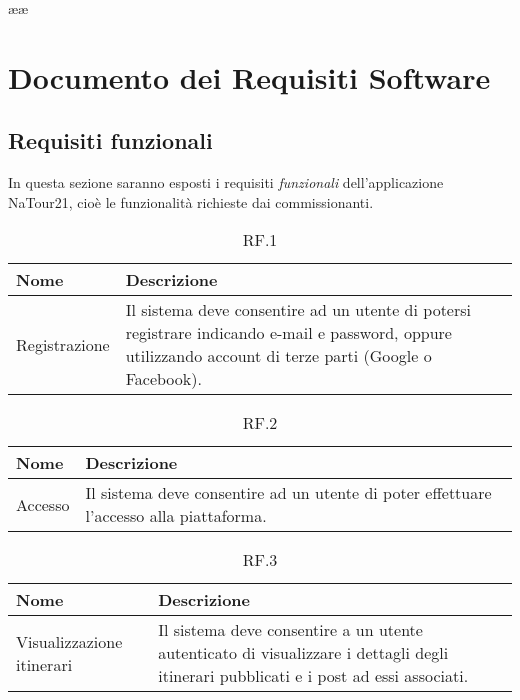ææ\documentclass{natourDoc}
\begin{document}
	\section{Documento dei Requisiti Software}
	\subsection{Requisiti funzionali}
	In questa sezione saranno esposti i requisiti \textit{funzionali} dell'applicazione NaTour21, cioè le funzionalità richieste dai commissionanti.
	
	\begin{table}[H]
		\centering
		\begin{tabular}{ |p{5cm}|p{10.3cm}| } 
			\hline
			\rowcolor{PineGreen!70}
			\textbf{Nome} & \textbf{Descrizione} \\
			\hline
			Registrazione & Il sistema deve consentire ad un utente di potersi registrare indicando e-mail e password, oppure utilizzando account di terze parti (Google o Facebook).\\ 
			\hline
		\end{tabular}
		\caption{RF.1}
		\label{table:1}
	\end{table}
	
	\begin{table}[H]
		\centering
		\begin{tabular}{ |p{5cm}|p{10.3cm}| } 
			\hline
			\rowcolor{PineGreen!70}
			\textbf{Nome} & \textbf{Descrizione} \\
			\hline
			Accesso & Il sistema deve consentire ad un utente di poter effettuare l'accesso alla piattaforma.\\ 
			\hline
		\end{tabular}
		\caption{RF.2}
		\label{table:2}
	\end{table}
	
	\begin{table}[H]
		\centering
		\begin{tabular}{ |p{5cm}|p{10.3cm}| }
			\hline
			\rowcolor{PineGreen!70}
			\textbf{Nome} & \textbf{Descrizione} \\
			\hline
			Visualizzazione itinerari & Il sistema deve consentire a un utente autenticato di visualizzare i
			dettagli degli itinerari pubblicati e i post ad essi associati. \\
			\hline
		\end{tabular}
		\caption{RF.3}
		\label{table:3}
	\end{table}
\end{document}
